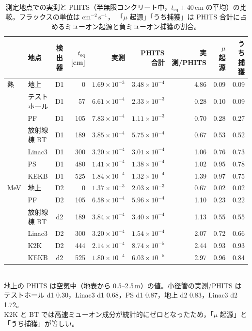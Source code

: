 \documentclass[a4paper,11pt]{ltjsarticle}
\newcommand{\teq}{t_{\mathrm{eq}}}
\newcommand{\flux}{\mathrm{cm^{-2}\,s^{-1}}}
\begin{document}
\begin{table}[htbp]
  \centering
  \caption{測定地点での実測と PHITS（半無限コンクリート中，$\teq\pm40$\,cm の平均）の比較。フラックスの単位は $\flux$，
  「$\mu$ 起源」「うち捕獲」は PHITS 合計に占めるミューオン起源と負ミューオン捕獲の割合。}
  \label{tab:phitscomp}
  \small
  \setlength{\tabcolsep}{4.5pt}
  \begin{tabular}{llcrrrrrr}
    \toprule
    & 地点 & 検出器 & $\teq$ [cm] & 実測 & PHITS 合計 & 実測/PHITS & $\mu$ 起源 & うち捕獲 \\
    \midrule
    熱 & 地上 & D1 & 0 & $1.69\times10^{-3}$ & $3.48\times10^{-4}$ & 4.86 & 0.09 & 0.09 \\
       & テストホール & D1 & 57 & $6.61\times10^{-4}$ & $2.33\times10^{-3}$ & 0.28 & 0.10 & 0.09 \\
       & PF & D1 & 105 & $7.83\times10^{-4}$ & $1.11\times10^{-3}$ & 0.70 & 0.28 & 0.27 \\
       & 放射線棟 BT & D1 & 189 & $3.85\times10^{-4}$ & $5.75\times10^{-4}$ & 0.67 & 0.53 & 0.52 \\
       & Linac3 & D1 & 300 & $3.20\times10^{-4}$ & $3.01\times10^{-4}$ & 1.06 & 0.76 & 0.73 \\
       & PS & D1 & 480 & $1.41\times10^{-4}$ & $1.38\times10^{-4}$ & 1.02 & 0.95 & 0.78 \\
       & KEKB & D1 & 525 & $1.84\times10^{-4}$ & $1.32\times10^{-4}$ & 1.39 & 0.97 & 0.75 \\
    \midrule
    MeV & 地上 & D2 & 0 & $1.37\times10^{-3}$ & $2.03\times10^{-3}$ & 0.67 & 0.02 & 0.02 \\
        & PF & D2 & 105 & $6.58\times10^{-4}$ & $5.96\times10^{-4}$ & 1.10 & 0.23 & 0.22 \\
        & 放射線棟 BT & d2 & 189 & $3.84\times10^{-4}$ & $3.40\times10^{-4}$ & 1.13 & 0.55 & 0.55 \\
        & Linac3 & D2 & 300 & $3.20\times10^{-4}$ & $1.54\times10^{-4}$ & 2.07 & 0.72 & 0.66 \\
        & K2K & D2 & 444 & $2.14\times10^{-4}$ & $8.74\times10^{-5}$ & 2.44 & 0.93 & 0.93 \\
        & KEKB & d2 & 525 & $1.80\times10^{-4}$ & $6.03\times10^{-5}$ & 2.97 & 0.96 & 0.84 \\
    \bottomrule
  \end{tabular}\\[2pt]
  \footnotesize 地上の PHITS は空気中（地表から 0.5--2.5\,m）の値。小径管の実測/PHITS は テストホール d1 0.30，Linac3 d1 0.68，PS d1 0.87，地上 d2 0.83，Linac3 d2 1.72。\\
  K2K と BT では高速ミューオン成分が統計的にゼロとなったため，「$\mu$ 起源」と「うち捕獲」が等しい。
\end{table}
\end{document}
